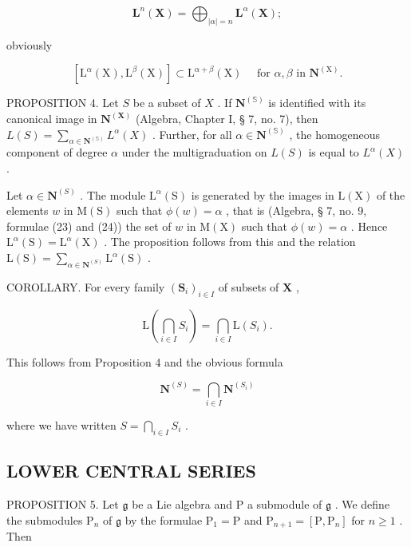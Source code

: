\[
\mathbf {L} ^ {n} (\mathbf {X}) = \bigoplus_ {| \alpha | = n} \mathbf {L} ^ {\alpha} (\mathbf {X});\tag{14}
\]

obviously

\[
[ \mathrm{L} ^ {\alpha} (\mathrm{X}), \mathrm{L} ^ {\beta} (\mathrm{X}) ] \subset \mathrm{L} ^ {\alpha + \beta} (\mathrm{X}) \quad \text { for } \alpha , \beta \text { in } \mathbf {N} ^ {(\mathrm{X})}.\tag{15}
\]

PROPOSITION 4. Let \(S\) be a subset of \(X\) . If \(\mathbf{N}^{(\mathbb{S})}\) is identified with its canonical image in \(\mathbf{N}^{(\mathbf{X})}\) (Algebra, Chapter I, § 7, no. 7), then \(L(S) = \sum_{\alpha \in \mathbf{N}^{(\mathbb{S})}} L^{\alpha}(X)\) . Further, for all \(\alpha \in \mathbf{N}^{(\mathbb{S})}\) , the homogeneous component of degree \(\alpha\) under the multigraduation on \(L(S)\) is equal to \(L^{\alpha}(X)\) .

 Let \(\alpha \in \mathbf{N}^{(S)}\) . The module \(\mathrm{L}^{\alpha}(\mathrm{S})\) is generated by the images in \(\mathrm{L}(\mathrm{X})\) of the elements \(w\) in \(\mathrm{M}(\mathrm{S})\) such that \(\phi(w) = \alpha\) , that is (Algebra, § 7, no. 9, formulae (23) and (24)) the set of \(w\) in \(\mathrm{M}(\mathrm{X})\) such that \(\phi(w) = \alpha\) . Hence \(\mathrm{L}^{\alpha}(\mathrm{S}) = \mathrm{L}^{\alpha}(\mathrm{X})\) . The proposition follows from this and the relation \(\mathrm{L}(\mathrm{S}) = \sum_{\alpha \in \mathbf{N}^{(S)}}\mathrm{L}^{\alpha}(\mathrm{S})\) .

COROLLARY. For every family \((\mathbf{S}_i)_{i\in I}\) of subsets of \(\mathbf{X}\) ,

\[
\mathrm{L} \left(\bigcap_ {i \in I} S _ {i}\right) = \bigcap_ {i \in I} \mathrm{L} (S _ {i}).\tag{16}
\]

This follows from Proposition 4 and the obvious formula

\[
\mathbf {N} ^ {(S)} = \bigcap_ {i \in I} \mathbf {N} ^ {(S _ {i})}\tag{17}
\]

where we have written \(S = \bigcap_{i \in I} S_i\) .

\subsection{LOWER CENTRAL SERIES}

PROPOSITION 5. Let \(\mathfrak{g}\) be a Lie algebra and \(\mathrm{P}\) a submodule of \(\mathfrak{g}\) . We define the submodules \(\mathrm{P}_n\) of \(\mathfrak{g}\) by the formulae \(\mathrm{P}_1 = \mathrm{P}\) and \(\mathrm{P}_{n+1} = [\mathrm{P},\mathrm{P}_n]\) for \(n\geqslant 1\) . Then

